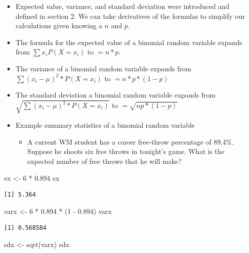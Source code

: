 \documentclass[
  letterpaper,
  DIV=11,
  numbers=noendperiod]{scrreprt}
\newenvironment{Shaded}{\begin{snugshade}}{\end{snugshade}}
\newcommand{\DecValTok}[1]{\textcolor[rgb]{0.68,0.00,0.00}{#1}}
\newcommand{\FloatTok}[1]{\textcolor[rgb]{0.68,0.00,0.00}{#1}}
\newcommand{\FunctionTok}[1]{\textcolor[rgb]{0.28,0.35,0.67}{#1}}
\newcommand{\NormalTok}[1]{\textcolor[rgb]{0.00,0.23,0.31}{#1}}
\newcommand{\OtherTok}[1]{\textcolor[rgb]{0.00,0.23,0.31}{#1}}
\newcommand{\SpecialCharTok}[1]{\textcolor[rgb]{0.37,0.37,0.37}{#1}}
\providecommand{\tightlist}{%
  \setlength{\itemsep}{0pt}\setlength{\parskip}{0pt}}\usepackage{longtable,booktabs,array}
\begin{document}
\begin{itemize}
\item
  Expected value, variance, and standard deviation were introduced and
  defined in section 2. We can take derivatives of the formulas to
  simplify our calculations given knowing a \(n\) and \(p\).
\item
  The formula for the expected value of a binomial random variable
  expands from \(\sum{x_iP(X=x_i)}\) to \(= n*p\).
\item
  The variance of a binomial random variable expands from
  \(\sum{(x_i-\mu)^2*P(X=x_i)}\) to \(= n*p*(1-p)\)
\item
  The standard deviation a binomial random variable expands from
  \(\sqrt{\sum{(x_i-\mu)^2*P(X=x_i)}}\) to \(= \sqrt{np*(1-p)}\)
\item
  Example summary statistics of a binomial random variable

  \begin{itemize}
  \tightlist
  \item
    A current WM student has a career free-throw percentage of 89.4\%.
    Suppose he shoots six free throws in tonight's game. What is the
    expected number of free throws that he will make?
  \end{itemize}
\end{itemize}

\begin{Shaded}
\begin{Highlighting}[]
\NormalTok{ex }\OtherTok{\textless{}{-}} \DecValTok{6} \SpecialCharTok{*} \FloatTok{0.894}
\NormalTok{ex}
\end{Highlighting}
\end{Shaded}

\begin{verbatim}
[1] 5.364
\end{verbatim}

\begin{Shaded}
\begin{Highlighting}[]
\NormalTok{varx }\OtherTok{\textless{}{-}} \DecValTok{6} \SpecialCharTok{*} \FloatTok{0.894} \SpecialCharTok{*}\NormalTok{ (}\DecValTok{1} \SpecialCharTok{{-}} \FloatTok{0.894}\NormalTok{)}
\NormalTok{varx}
\end{Highlighting}
\end{Shaded}

\begin{verbatim}
[1] 0.568584
\end{verbatim}

\begin{Shaded}
\begin{Highlighting}[]
\NormalTok{sdx }\OtherTok{\textless{}{-}} \FunctionTok{sqrt}\NormalTok{(varx)}
\NormalTok{sdx}
\end{Highlighting}
\end{Shaded}
\end{document}
